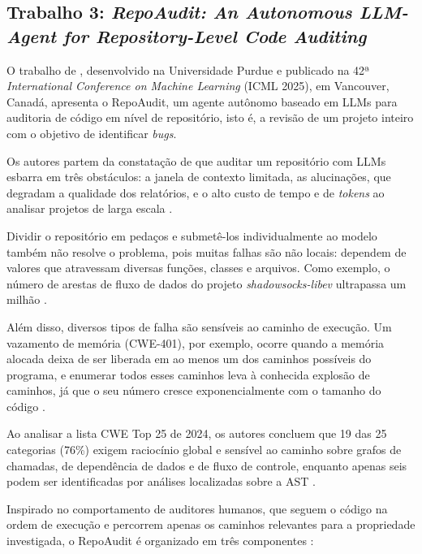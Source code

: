 \documentclass[
    12pt,                %
    openright,           %
    oneside,             %
    a4paper,             %
    english,             %
    brazil               %
]{abntex2}
\begin{document}
\subsection[Trabalho 3: \textit{RepoAudit: An Autonomous LLM-Agent for Repository-Level Code Auditing} \cite{guo2025repoaudit}]{Trabalho 3: \textit{RepoAudit: An Autonomous LLM-Agent for Repository-Level Code Auditing} \cite{guo2025repoaudit}}
\label{sec:repoaudit}
\par
O trabalho de , desenvolvido na Universidade Purdue e publicado na 42ª \textit{International Conference on Machine Learning} (ICML 2025), em Vancouver, Canadá, apresenta o RepoAudit, um agente autônomo baseado em LLMs para auditoria de código em nível de repositório, isto é, a revisão de um projeto inteiro com o objetivo de identificar \textit{bugs}.
\par
Os autores partem da constatação de que auditar um repositório com LLMs esbarra em três obstáculos: a janela de contexto limitada, as alucinações, que degradam a qualidade dos relatórios, e o alto custo de tempo e de \textit{tokens} ao analisar projetos de larga escala \cite{guo2025repoaudit}.
\par
Dividir o repositório em pedaços e submetê-los individualmente ao modelo também não resolve o problema, pois muitas falhas são não locais: dependem de valores que atravessam diversas funções, classes e arquivos.
Como exemplo, o número de arestas de fluxo de dados do projeto \textit{shadowsocks-libev} ultrapassa um milhão \cite{guo2025repoaudit}.
\par
Além disso, diversos tipos de falha são sensíveis ao caminho de execução.
Um vazamento de memória (CWE-401), por exemplo, ocorre quando a memória alocada deixa de ser liberada em ao menos um dos caminhos possíveis do programa, e enumerar todos esses caminhos leva à conhecida explosão de caminhos, já que o seu número cresce exponencialmente com o tamanho do código \cite{guo2025repoaudit}.
\par
Ao analisar a lista CWE Top 25 de 2024, os autores concluem que 19 das 25 categorias (76\%) exigem raciocínio global e sensível ao caminho sobre grafos de chamadas, de dependência de dados e de fluxo de controle, enquanto apenas seis podem ser identificadas por análises localizadas sobre a AST \cite{guo2025repoaudit}.
\par
Inspirado no comportamento de auditores humanos, que seguem o código na ordem de execução e percorrem apenas os caminhos relevantes para a propriedade investigada, o RepoAudit é organizado em três componentes \cite{guo2025repoaudit}:
\end{document}
